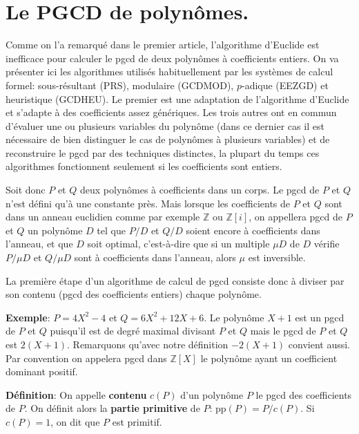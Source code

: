 \documentclass[a4paper,11pt]{article}
\newcommand{\Z}{{\mathbb{Z}}}
\begin{document}
\begin{giacjshere}
\begin{enumerate}
\end{enumerate}
\pagebreak

\section{Le PGCD de polynômes.} \label{sec:pgcd} 
Comme on l'a remarqué dans le premier article, l'algorithme d'Euclide est
inefficace pour calculer le pgcd de deux polynômes à coefficients entiers. On
va présenter ici les algorithmes utilisés habituellement par les systèmes de
calcul formel: sous-résultant (PRS), modulaire (GCDMOD), $p$-adique (EEZGD) et
heuristique (GCDHEU). Le premier est une adaptation de l'algorithme d'Euclide
et s'adapte à des coefficients assez génériques. Les trois autres ont en
commun d'évaluer une ou plusieurs variables du polynôme (dans ce dernier cas
il est nécessaire de bien distinguer le cas de polynômes à plusieurs
variables) et de reconstruire le pgcd par des techniques distinctes, la
plupart du temps ces algorithmes fonctionnent seulement si les coefficients
sont entiers.

Soit donc $ P$ et $Q$ deux polynômes à coefficients dans un corps. Le
pgcd de $P$ et $Q$ n'est défini qu'à une constante près. Mais lorsque les
coefficients de $P$ et $Q$ sont dans un anneau euclidien comme par exemple
$\mathbb{Z}$ ou
$\mathbb{Z}[ i ]$, on appellera pgcd de $P$ et $Q$ un polynôme $D$ tel
que $P / D$ et $Q / D$ soient encore à coefficients dans l'anneau, et que $D$
soit optimal, c'est-à-dire que si un multiple $\mu D$ de $D$ vérifie $P / \mu
D$ et $Q / \mu D$ sont à coefficients dans l'anneau, alors $\mu$ est
inversible. 

La première étape d'un algorithme de calcul de pgcd consiste donc
à diviser par son contenu (pgcd des coefficients entiers) chaque polynôme.

{\bf{Exemple}}: $P = 4 X^2 - 4$ et $Q = 6 X^2 + 12 X + 6$. Le polynôme
$X + 1$ est un pgcd de $P$ et $Q$ puisqu'il est de degré maximal divisant $P$
et $Q$ mais le pgcd de $P$ et $Q$ est $2 ( X + 1 )$. Remarquons qu'avec notre
définition $- 2 ( X + 1 )$ convient aussi. Par convention on appelera
pgcd dans $\Z[X]$ le
polynôme ayant un coefficient dominant positif.

{\bf{Définition}}: On appelle {\bf contenu} $c ( P )$ d'un polynôme $P$ le
pgcd des coefficients de $P$. On définit alors la 
{\bf partie primitive} de $P$:
pp$( P ) = P / c ( P )$. Si $c(P)=1$, on dit que $P$ est primitif.


\end{giacjshere}
\end{document}
